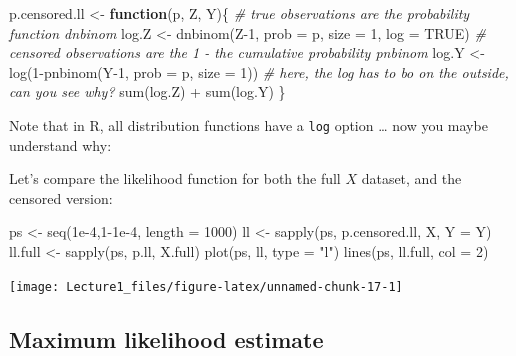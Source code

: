 \documentclass[]{tufte-handout}
\newenvironment{Shaded}{}{}
\newcommand{\AttributeTok}[1]{\textcolor[rgb]{0.49,0.56,0.16}{#1}}
\newcommand{\CommentTok}[1]{\textcolor[rgb]{0.38,0.63,0.69}{\textit{#1}}}
\newcommand{\ConstantTok}[1]{\textcolor[rgb]{0.53,0.00,0.00}{#1}}
\newcommand{\ControlFlowTok}[1]{\textcolor[rgb]{0.00,0.44,0.13}{\textbf{#1}}}
\newcommand{\DecValTok}[1]{\textcolor[rgb]{0.25,0.63,0.44}{#1}}
\newcommand{\FloatTok}[1]{\textcolor[rgb]{0.25,0.63,0.44}{#1}}
\newcommand{\FunctionTok}[1]{\textcolor[rgb]{0.02,0.16,0.49}{#1}}
\newcommand{\NormalTok}[1]{#1}
\newcommand{\OtherTok}[1]{\textcolor[rgb]{0.00,0.44,0.13}{#1}}
\newcommand{\SpecialCharTok}[1]{\textcolor[rgb]{0.25,0.44,0.63}{#1}}
\newcommand{\StringTok}[1]{\textcolor[rgb]{0.25,0.44,0.63}{#1}}
\begin{document}
\begin{Shaded}
\begin{Highlighting}[]
\NormalTok{p.censored.ll }\OtherTok{\textless{}{-}} \ControlFlowTok{function}\NormalTok{(p, Z, Y)\{}
    \CommentTok{\# true observations are the probability function dnbinom}
\NormalTok{    log.Z }\OtherTok{\textless{}{-}} \FunctionTok{dnbinom}\NormalTok{(Z}\DecValTok{{-}1}\NormalTok{, }\AttributeTok{prob =}\NormalTok{ p, }\AttributeTok{size =} \DecValTok{1}\NormalTok{, }\AttributeTok{log =} \ConstantTok{TRUE}\NormalTok{)   }
    \CommentTok{\# censored observations are the 1 {-} the cumulative probability pnbinom }
\NormalTok{    log.Y }\OtherTok{\textless{}{-}} \FunctionTok{log}\NormalTok{(}\DecValTok{1}\SpecialCharTok{{-}}\FunctionTok{pnbinom}\NormalTok{(Y}\DecValTok{{-}1}\NormalTok{, }\AttributeTok{prob =}\NormalTok{ p, }\AttributeTok{size =} \DecValTok{1}\NormalTok{))}
    \CommentTok{\# here, the log has to bo on the outside, can you see why?}
    \FunctionTok{sum}\NormalTok{(log.Z) }\SpecialCharTok{+} \FunctionTok{sum}\NormalTok{(log.Y)}
\NormalTok{\}}
\end{Highlighting}
\end{Shaded}

Note that in R, all distribution functions have a \texttt{log} option
\ldots{} now you maybe understand why:

Let's compare the likelihood function for both the full \(X\) dataset,
and the censored version:

\begin{Shaded}
\begin{Highlighting}[]
\NormalTok{ps }\OtherTok{\textless{}{-}} \FunctionTok{seq}\NormalTok{(}\FloatTok{1e{-}4}\NormalTok{,}\DecValTok{1}\FloatTok{{-}1e{-}4}\NormalTok{, }\AttributeTok{length =} \DecValTok{1000}\NormalTok{)}
\NormalTok{ll }\OtherTok{\textless{}{-}} \FunctionTok{sapply}\NormalTok{(ps, p.censored.ll, X, }\AttributeTok{Y =}\NormalTok{ Y)}
\NormalTok{ll.full }\OtherTok{\textless{}{-}} \FunctionTok{sapply}\NormalTok{(ps, p.ll, X.full)}
\FunctionTok{plot}\NormalTok{(ps, ll, }\AttributeTok{type =} \StringTok{"l"}\NormalTok{)}
\FunctionTok{lines}\NormalTok{(ps, ll.full, }\AttributeTok{col =} \DecValTok{2}\NormalTok{)}
\end{Highlighting}
\end{Shaded}

\texttt{[image: Lecture1\_files/figure-latex/unnamed-chunk-17-1]}

\subsection{Maximum likelihood
estimate}\label{maximum-likelihood-estimate-1}
\end{document}
